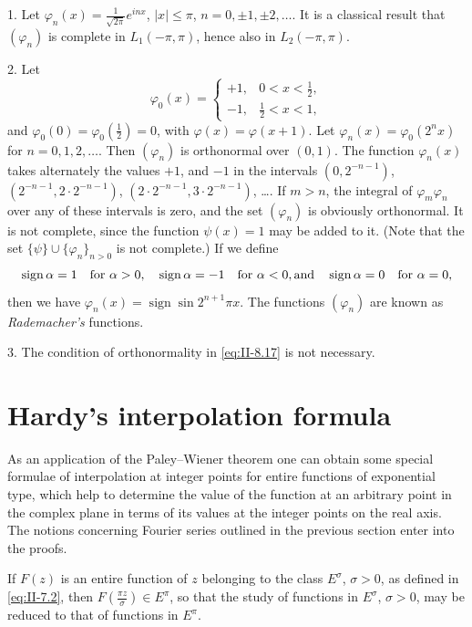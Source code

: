 \begin{remark}
1. Let $\varphi_{n}(x)=\frac{1}{\sqrt{2\pi}}e^{inx}$, $|x|\le\pi$, $n=0,\pm1,\pm2,\dots$. It is a classical result that $(\varphi_{n})$ is complete in $L_{1}(-\pi,\pi)$, hence also in $L_{2}(-\pi,\pi)$.

2. Let
\[
\varphi_{0}(x)=
\begin{cases}
+1, & 0<x<\frac{1}{2},\\
-1, & \frac{1}{2}<x<1,
\end{cases}
\]
and $\varphi_{0}(0)=\varphi_{0}(\frac{1}{2})=0$, with $\varphi(x)=\varphi(x+1)$. Let $\varphi_{n}(x)=\varphi_{0}(2^{n}x)$ for $n=0,1,2,\dots$. Then $(\varphi_{n})$ is orthonormal over $(0,1)$. The function $\varphi_{n}(x)$ takes alternately the values $+1$, and $-1$ in the intervals $(0,2^{-n-1})$, $(2^{-n-1},2\cdot2^{-n-1})$, $(2\cdot2^{-n-1},3\cdot2^{-n-1})$, \dots. If $m>n$, the integral of $\varphi_{m}\varphi_{n}$ over any of these intervals is zero, and the set $(\varphi_{n})$ is obviously orthonormal. It is not complete, since the function $\psi(x)=1$ may be added to it. (Note that the set $\{\psi\}\cup\{\varphi_{n}\}_{n>0}$ is not complete.) If we define
\[
\operatorname{sign}\alpha=1\quad\text{for }\alpha>0,\quad \operatorname{sign}\alpha=-1\quad\text{for }\alpha<0,\\
\text{and}\quad \operatorname{sign}\alpha=0\quad\text{for }\alpha=0,
\]
then we have $\varphi_{n}(x)=\operatorname{sign}\sin 2^{n+1}\pi x$. The functions $(\varphi_{n})$ are known as \emph{Rademacher's} functions.

3. The condition of orthonormality in \eqref{eq:II-8.17} is not necessary.
\end{remark}

\setcounter{section}{8}
\section{Hardy's interpolation formula}
\label{sec:II-9}

As an application of the Paley--Wiener theorem one can obtain some special formulae of interpolation at integer points for entire functions of exponential type, which help to determine the value of the function at an arbitrary point in the complex plane in terms of its values at the integer points on the real axis. The notions concerning Fourier series outlined in the previous section enter into the proofs.

If $F(z)$ is an entire function of $z$ belonging to the class $E^{\sigma}$, $\sigma>0$, as defined in \eqref{eq:II-7.2}, then $F(\frac{\pi z}{\sigma})\in E^{\pi}$, so that the study of functions in $E^{\sigma}$, $\sigma>0$, may be reduced to that of functions in $E^{\pi}$.

